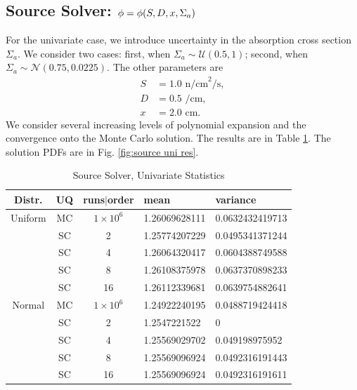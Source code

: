 \subsection{Source Solver: $\phi=\phi\qty(S,D,x,\Sigma_a)$}
For the univariate case, we introduce uncertainty in the absorption cross section $\Sigma_a$.  We consider two cases: first, when $\Sigma_a\sim\mathcal{U}(0.5,1)$; second, when $\Sigma_a\sim\mathcal{N}(0.75,0.0225)$.  The other parameters are
\begin{align}
S &= 1.0 \text{ n/cm}^2\text{/s},\\
D &= 0.5 \text{ /cm},\\
x &= 2.0 \text{ cm}.
\end{align}
We consider several increasing levels of polynomial expansion and the convergence onto the Monte Carlo solution.  The results are in Table \ref{tab: source uni res}.  The solution PDFs are in Fig. \ref{fig:source uni res}.

\begin{table}[H]
\begin{center}
\begin{tabular}{c|c c|l l}
Distr. & UQ & runs$|$order & mean & variance \\ \hline
Uniform & MC & $1\times10^6$ & 1.26069628111 &  0.0632432419713 \\
 & SC & 2 & 1.25774207229 & 0.0495341371244 \\
 & SC & 4 & 1.26064320417 & 0.0604388749588 \\
 & SC & 8 & 1.26108375978 & 0.0637370898233\\
 & SC & 16 & 1.26112339681 & 0.0639754882641 \\ \hline
Normal & MC & $1\times10^6$ & 1.24922240195 & 0.0488719424418 \\
&SC & 2 & 1.2547221522 & 0  \\
&SC & 4 & 1.25569029702 & 0.049198975952  \\
&SC & 8 & 1.25569096924 & 0.0492316191443 \\
&SC & 16 & 1.25569096924 & 0.0492316191611
\end{tabular}
\end{center}
\caption{Source Solver, Univariate Statistics}
\label{tab: source uni res}
\end{table}

